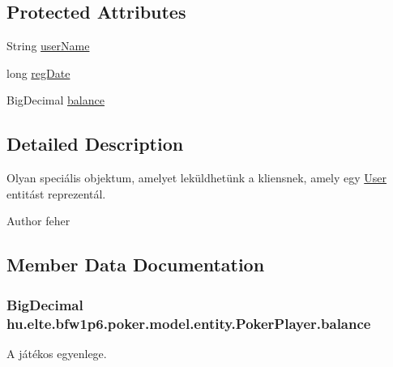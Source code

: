 \subsection*{Protected Attributes}
\begin{DoxyCompactItemize}
\item 
String \hyperlink{classhu_1_1elte_1_1bfw1p6_1_1poker_1_1model_1_1entity_1_1_poker_player_a7ce646bef4bf8f58972dc22d6435bead}{user\+Name}
\item 
long \hyperlink{classhu_1_1elte_1_1bfw1p6_1_1poker_1_1model_1_1entity_1_1_poker_player_a28e40f51bb34e7cd89b2c96f6c2dd042}{reg\+Date}
\item 
Big\+Decimal \hyperlink{classhu_1_1elte_1_1bfw1p6_1_1poker_1_1model_1_1entity_1_1_poker_player_a835c44f5298ae81cbc78a14d5f461fd0}{balance}
\end{DoxyCompactItemize}


\subsection{Detailed Description}
Olyan speciális objektum, amelyet leküldhetünk a kliensnek, amely egy \hyperlink{classhu_1_1elte_1_1bfw1p6_1_1poker_1_1model_1_1entity_1_1_user}{User} entitást reprezentál. \begin{DoxyAuthor}{Author}
feher 
\end{DoxyAuthor}


\subsection{Member Data Documentation}
\hypertarget{classhu_1_1elte_1_1bfw1p6_1_1poker_1_1model_1_1entity_1_1_poker_player_a835c44f5298ae81cbc78a14d5f461fd0}{}
\subsubsection[{balance}]{\setlength{\rightskip}{0pt plus 5cm}Big\+Decimal hu.\+elte.\+bfw1p6.\+poker.\+model.\+entity.\+Poker\+Player.\+balance\hspace{0.3cm}{\ttfamily [protected]}}\label{classhu_1_1elte_1_1bfw1p6_1_1poker_1_1model_1_1entity_1_1_poker_player_a835c44f5298ae81cbc78a14d5f461fd0}
A játékos egyenlege. \hypertarget{classhu_1_1elte_1_1bfw1p6_1_1poker_1_1model_1_1entity_1_1_poker_player_a28e40f51bb34e7cd89b2c96f6c2dd042}{}
